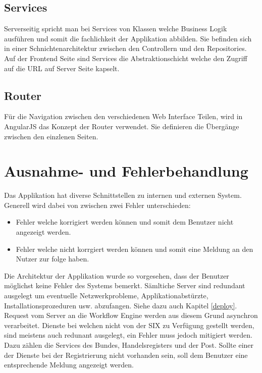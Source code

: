 \subsection{Services}

Serverseitig spricht man bei Services von Klassen welche Business Logik ausführen und somit die fachlichkeit der Applikation abbilden. Sie befinden sich in einer Schnichtenarchitektur zwischen den Controllern und den Repositories. Auf der Frontend Seite sind Services die Abstraktionschicht welche den Zugriff auf die URL auf Server Seite kapselt.

\subsection{Router}

Für die Navigation zwischen den verschiedenen Web Interface Teilen, wird in AngularJS das Konzept der Router verwendet. Sie definieren die Übergänge zwischen den einzlenen Seiten.

\section{Ausnahme- und Fehlerbehandlung}

Das Applikation hat diverse Schnittstellen zu internen und externen System. Generell wird dabei von zwischen zwei Fehler unterschieden:
\begin{itemize}
	\item Fehler welche korrigiert werden können und somit dem Benutzer nicht angezeigt werden.
	\item Fehler welche nicht korrgiert werden können und somit eine Meldung an den Nutzer zur folge haben.
\end{itemize}
Die Architektur der Applikation wurde so vorgesehen, dass der Benutzer möglichst keine Fehler des Systems bemerkt. Sämltiche Server sind redundant ausgelegt um eventuelle Netzwerkprobleme, Applikationabstürzte, Installationsprozeduren usw. abzufangen. Siehe dazu auch Kapitel \ref{deploy}. Request vom Server an die Workflow Engine werden aus diesem Grund asynchron verarbeitet.\newline
Dienste bei welchen nicht von der SIX zu Verfügung gestellt werden, sind meistens auch redunant ausgelegt, ein Fehler muss jedoch mitigiert werden. Dazu zählen die Services des Bundes, Handelsregisters und der Post. Sollte einer der Dienste bei der Registrierung nicht vorhanden sein, soll dem Benutzer eine entsprechende Meldung angezeigt werden.

